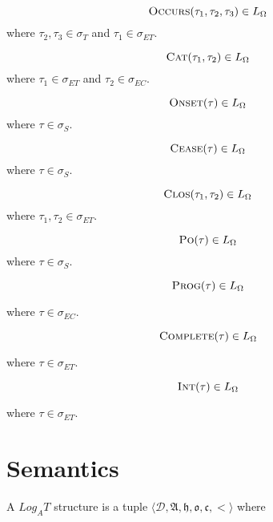 


\[
	\textsc{Occurs}(\tau_1, \tau_2, \tau_3) \in L_{\Omega}
\]
where $\tau_2, \tau_3 \in \sigma_T$  and $\tau_1 \in \sigma_{ET}$.

\[
	\textsc{Cat}(\tau_1, \tau_2) \in L_{\Omega}
\]
where $\tau_1 \in \sigma_{ET}$ and $\tau_2 \in \sigma_{EC}$.

\[
	\textsc{Onset}(\tau) \in L_{\Omega}
\]
where $\tau \in \sigma_S$.

\[
	\textsc{Cease}(\tau) \in L_{\Omega}
\]
where $\tau \in \sigma_S$.

\[
	\textsc{Clos}(\tau_1, \tau_2) \in L_{\Omega}
\]
where $\tau_1, \tau_2 \in \sigma_{ET}$.

\[
	\textsc{Po}(\tau) \in L_{\Omega}
\]
where $\tau \in \sigma_S$.

\[
	\textsc{Prog}(\tau) \in L_{\Omega}
\]

where $\tau \in \sigma_{EC}$.

\[
	\textsc{Complete}(\tau) \in L_{\Omega}
\]

where $\tau \in \sigma_{ET}$.

\[
	\textsc{Int}(\tau) \in L_{\Omega}
\]

where $\tau \in \sigma_{ET}$.

\section{Semantics}

\begin{defn}
	A $Log_AT$ structure is a tuple $\langle \mathcal{D},\mathfrak{A}, \mathfrak{h}, \mathfrak{o}, \mathfrak{c}, <
		\rangle$ where
\end{defn}


